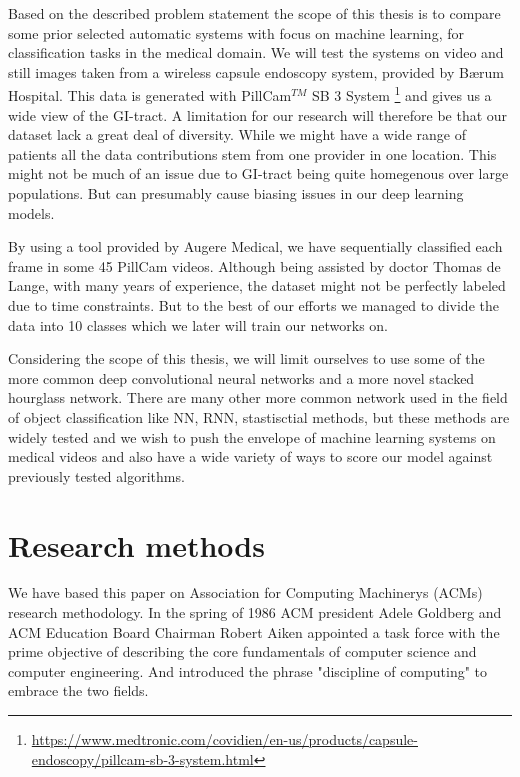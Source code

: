 \documentclass[thesis.tex]{subfiles}
\begin{document}
Based on the described problem statement the scope of this thesis is to compare some prior selected automatic systems with focus on machine learning, for classification tasks in the medical domain. We will test the systems on video and still images taken from a wireless capsule endoscopy system, provided by Bærum Hospital. This data is generated with PillCam$^{TM}$ SB 3 System \footnote{\url{https://www.medtronic.com/covidien/en-us/products/capsule-endoscopy/pillcam-sb-3-system.html}} and gives us a wide view of the GI-tract. A limitation for our research will therefore be that our dataset lack a great deal of diversity. While we might have a wide range of patients all the data contributions stem from one provider in one location. This might not be much of an issue due to GI-tract being quite homegenous over large populations. But can presumably cause biasing issues in our deep learning models. %

By using a tool provided by Augere Medical, we have sequentially classified each frame in some 45 PillCam videos. Although being assisted by doctor Thomas de Lange, with many years of experience, the dataset might not be perfectly labeled due to time constraints. But to the best of our efforts we managed to divide the data into 10 classes which we later will train our networks on.

Considering the scope of this thesis, we will limit ourselves to use some of the more common deep convolutional neural networks and a more novel stacked hourglass network. There are many other more common network used in the field of object classification like NN, RNN, stastisctial methods, but these methods are widely tested and we wish to push the envelope of machine learning systems on medical videos and also have a wide variety of ways to score our model against previously tested algorithms.


\section{Research methods} \label{sec:research_methods}
We have based this paper on Association for Computing Machinerys (ACMs) research
methodology. In the spring of 1986 ACM president Adele Goldberg and ACM Education Board Chairman Robert Aiken appointed a task force with the prime objective of describing the core fundamentals of computer science and computer engineering. And introduced the phrase "discipline of computing" to embrace the two fields.
\end{document}
